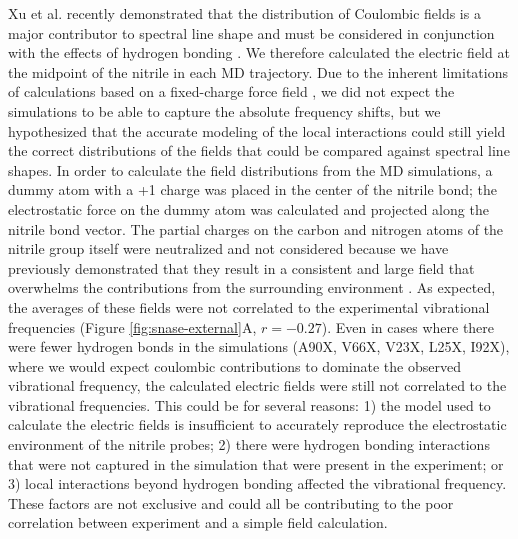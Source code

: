 Xu et al. recently demonstrated that the distribution of Coulombic fields is a major contributor to spectral line shape and must be considered in conjunction with the effects of hydrogen bonding \cite{Xu2018}. 
We therefore calculated the electric field at the midpoint of the nitrile in each MD trajectory. 
Due to the inherent limitations of calculations based on a fixed-charge force field \cite{Slocum2017, Ritchie2013, Ritchie2014, Ensign2011}, we did not expect the simulations to be able to capture the absolute frequency shifts, but we hypothesized that the  accurate modeling of the local interactions could still yield the correct distributions of the fields that could be compared against spectral line shapes. 
In order to calculate the field distributions from the MD simulations, a dummy atom with a +1 charge was placed in the center of the nitrile bond; 
the electrostatic force on the dummy atom was calculated and projected along the nitrile bond vector. 
The partial charges on the carbon and nitrogen atoms of the nitrile group itself were neutralized and not considered because we have previously demonstrated that they result in a consistent and large field that overwhelms the contributions from the surrounding environment \cite{Stafford2010, Ritchie2013}. 
As expected, the averages of these fields were not correlated to the experimental vibrational frequencies (Figure \ref{fig:snase-external}A, $r = -0.27$). 
Even in cases where there were fewer hydrogen bonds in the simulations (A90X, V66X, V23X, L25X, I92X), where we would expect coulombic contributions to dominate the observed vibrational frequency, the calculated electric fields were still not correlated to the vibrational frequencies. 
This could be for several reasons: 
1) the model used to calculate the electric fields is insufficient to accurately reproduce the electrostatic environment of the nitrile probes; 
2) there were hydrogen bonding interactions that were not captured in the simulation that were present in the experiment; or 
3) local interactions beyond hydrogen bonding affected the vibrational frequency. 
These factors are not exclusive and could all be contributing to the poor correlation between experiment and a simple field calculation.

